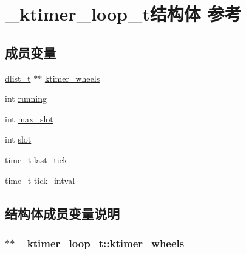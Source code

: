 \hypertarget{a00018}{}\section{\+\_\+ktimer\+\_\+loop\+\_\+t结构体 参考}
\label{a00018}
\subsection*{成员变量}
\begin{DoxyCompactItemize}
\item 
\hyperlink{a00044_ad6644d67df4b4e3596c1eb12977d1d16_ad6644d67df4b4e3596c1eb12977d1d16}{dlist\+\_\+t} $\ast$$\ast$ \hyperlink{a00018_af68f6f946f2b3583d04d8a459b738d29_af68f6f946f2b3583d04d8a459b738d29}{ktimer\+\_\+wheels}
\item 
int \hyperlink{a00018_aab0b79491b93f3752c93dfb1d8c60e66_aab0b79491b93f3752c93dfb1d8c60e66}{running}
\item 
int \hyperlink{a00018_aeb8772fdff5de87ce1db9878f1357043_aeb8772fdff5de87ce1db9878f1357043}{max\+\_\+slot}
\item 
int \hyperlink{a00018_ae54f1df7a355b968dcc9baf7dca10a8d_ae54f1df7a355b968dcc9baf7dca10a8d}{slot}
\item 
time\+\_\+t \hyperlink{a00018_aa0cf5e5f3b5532aa4335d25831c9d2c3_aa0cf5e5f3b5532aa4335d25831c9d2c3}{last\+\_\+tick}
\item 
time\+\_\+t \hyperlink{a00018_a5bfbb75720e6a5310417980347763c82_a5bfbb75720e6a5310417980347763c82}{tick\+\_\+intval}
\end{DoxyCompactItemize}


\subsection{结构体成员变量说明}
\hypertarget{a00018_af68f6f946f2b3583d04d8a459b738d29_af68f6f946f2b3583d04d8a459b738d29}{}
\subsubsection[{ktimer\+\_\+wheels}]{$\ast$$\ast$ \+\_\+ktimer\+\_\+loop\+\_\+t\+::ktimer\+\_\+wheels}\label{a00018_af68f6f946f2b3583d04d8a459b738d29_af68f6f946f2b3583d04d8a459b738d29}
\hypertarget{a00018_aa0cf5e5f3b5532aa4335d25831c9d2c3_aa0cf5e5f3b5532aa4335d25831c9d2c3}{}

